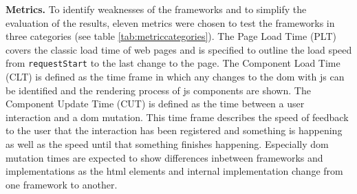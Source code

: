 \documentclass[a4paper, 12pt]{article}
\begin{document}
\textbf{Metrics.} To identify weaknesses of the frameworks and to simplify the evaluation of the results, eleven metrics were chosen to test the frameworks in three categories (see table \ref{tab:metriccategories}).
The Page Load Time (PLT) covers the classic load time of web pages and is specified to outline the load speed from \verb|requestStart| to the last change to the page.
The Component Load Time (CLT) is defined as the time frame in which any changes to the \acrshort{dom} with \acrshort{js} can be identified and the rendering process of \acrshort{js} components are shown.
The Component Update Time (CUT) is defined as the time between a user interaction and a \acrshort{dom} mutation.
This time frame describes the speed of feedback to the user that the interaction has been registered and something is happening as well as the speed until that something finishes happening.
Especially \acrshort{dom} mutation times are expected to show differences inbetween frameworks and implementations as the \acrshort{html} elements and internal implementation change from one framework to another.
\end{document}
